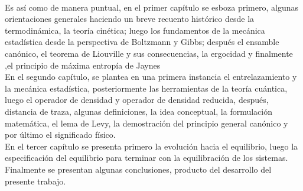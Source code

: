 \\
Es así como de manera puntual, en el primer capítulo se esboza primero, algunas orientaciones generales haciendo un breve recuento histórico desde la termodinámica, la teoría cinética; luego los fundamentos de la mecánica estadística desde la perspectiva de Boltzmann y Gibbs; después  el ensamble canónico, el teorema de Liouville  y sus consecuencias, la ergocidad  y finalmente ,el principio de máxima entropía de Jaynes     
\\
En el segundo capítulo, se plantea en una primera instancia el entrelazamiento y la mecánica estadística, posteriormente las herramientas de la teoría cuántica, luego el operador de densidad y operador de densidad reducida, después, distancia de traza, algunas definiciones, la idea conceptual, la formulación matemática, el lema de Levy, la demostración del principio general canónico y por último el significado físico.
\\
En el tercer capítulo se presenta primero la evolución hacia el equilibrio, luego la especificación del equilibrio para terminar con la equilibración de los sistemas.
\\
Finalmente se presentan algunas conclusiones, producto del desarrollo del presente trabajo. 


